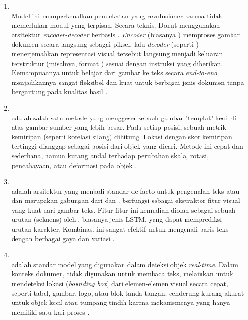 \begin{enumerate}
    \item \donut{} ~\\ Model ini memperkenalkan pendekatan yang revolusioner karena tidak memerlukan modul \ocr{} yang terpisah. Secara teknis, Donut menggunakan arsitektur \textit{encoder-decoder} berbasis \transformer. \textit{Encoder} (biasanya \swin) memproses gambar dokumen secara langsung sebagai piksel, lalu \textit{decoder} (seperti \bart) menerjemahkan representasi visual tersebut langsung menjadi keluaran terstruktur (misalnya, format \json) sesuai dengan instruksi yang diberikan. Kemampuannya untuk belajar dari gambar ke teks secara \textit{end-to-end} menjadikannya sangat fleksibel dan kuat untuk berbagai jenis dokumen tanpa bergantung pada kualitas hasil \ocr{} \parencite{kim2021donut}.

    \item \templatematching{} ~\\ \templatematching{} adalah salah satu metode \cv yang menggeser sebuah gambar "templat" kecil di atas gambar sumber yang lebih besar. Pada setiap posisi, sebuah metrik kemiripan (seperti korelasi silang) dihitung. Lokasi dengan skor kemiripan tertinggi dianggap sebagai posisi dari objek yang dicari. Metode ini cepat dan sederhana, namun kurang andal terhadap perubahan skala, rotasi, pencahayaan, atau deformasi pada objek \parencite{bradski2008learning}.

    \item \crnn ~\\ 
    \crnn{} adalah arsitektur \dl{} yang menjadi standar de facto untuk pengenalan teks atau \ocr{} dan merupakan gabungan dari \cnn{} dan \rnn. \cnn{} berfungsi sebagai ekstraktor fitur visual yang kuat dari gambar teks. Fitur-fitur ini kemudian diolah sebagai sebuah urutan (sekuens) oleh \rnn, biasanya jenis LSTM, yang dapat memprediksi urutan karakter. Kombinasi ini sangat efektif untuk mengenali baris teks dengan berbagai gaya dan variasi \parencite{shi2016end}.

    \item \yolo ~\\ \yolo{} adalah standar model yang digunakan dalam deteksi objek \textit{real-time}. Dalam konteks dokumen, \yolo{} tidak digunakan untuk membaca teks, melainkan untuk mendeteksi lokasi (\emph{bounding box}) dari elemen-elemen visual secara cepat, seperti tabel, gambar, logo, atau blok tanda tangan. \yolo{} cenderung kurang akurat untuk objek kecil atau tumpang tindih karena mekanismenya yang hanya memiliki satu kali proses \parencite{diwan2023object}. 
    

\end{enumerate}
